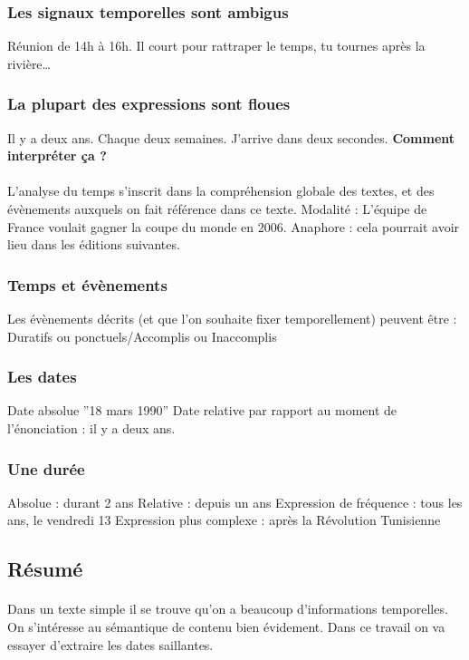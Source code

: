 \subsubsection*{Les signaux temporelles sont ambigus}
Réunion de 14h à 16h.
\newline
Il court pour rattraper le temps, tu tournes après la rivière…
\subsubsection*{La plupart des expressions sont floues}
Il y a deux ans. 
\newline
Chaque deux semaines.
\newline
J’arrive dans deux secondes.
\newline
\textbf{Comment interpréter ça ?}
\paragraph{}
L’analyse du temps s’inscrit dans la compréhension globale des textes, et des évènements auxquels on fait référence dans ce texte. 
\newline
Modalité : L’équipe de France voulait gagner la coupe du monde en 2006. 
\newline
Anaphore : cela pourrait avoir lieu dans les éditions suivantes.
\subsubsection*{Temps et évènements}
Les évènements décrits (et que l’on souhaite fixer temporellement) peuvent être :
\newline
Duratifs ou ponctuels/Accomplis ou Inaccomplis 
\subsubsection*{Les dates}
Date absolue ''18 mars 1990''
\newline
Date relative par rapport au moment de l’énonciation : il y a deux ans.
\subsubsection*{Une durée}
Absolue : durant 2 ans
\newline
Relative : depuis un ans 
\newline
Expression de fréquence : tous les ans, le vendredi 13
\newline
Expression plus complexe : après la Révolution Tunisienne
\subsection*{Résumé}
\paragraph{}
Dans un texte simple il se trouve qu’on a beaucoup d’informations temporelles. On s'intéresse au sémantique de contenu bien évidement. Dans ce travail on va essayer d’extraire les dates saillantes.








